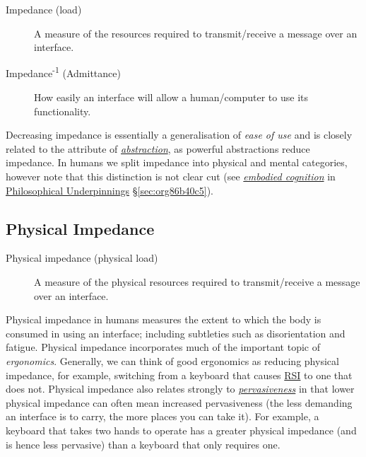 \documentclass[logo,bsc,singlespacing,parskip]{infthesis}
\begin{document}
\begin{mdframed}
\begin{description}
\item[{Impedance\label{impedance} (load)}] A measure of the resources required to transmit/receive a message over an interface.

\item[{Impedance\textsuperscript{-1} (Admittance)}] How easily an interface will allow a human/computer to use its functionality.
\end{description}
\end{mdframed}

Decreasing impedance is essentially a generalisation of \emph{ease of use} and is closely related to the attribute of \emph{\hyperref[abstraction]{abstraction}}, as powerful abstractions reduce impedance.
In humans we split impedance into physical and mental categories, however note that this distinction is not clear cut (see \emph{\hyperref[orgef09c3f]{embodied cognition}} in \hyperref[sec:org86b40c5]{Philosophical Underpinnings} \S \ref{sec:org86b40c5}).
\subsection{Physical Impedance}
\label{sec:org8699e79}
\medskip
\begin{mdframed}
\begin{description}
\item[{Physical impedance\label{physical impedance} (physical load)}] A measure of the physical resources required to transmit/receive a message over an interface.
\end{description}
\end{mdframed}

Physical impedance in humans measures the extent to which the body is consumed in using an interface; including subtleties such as disorientation and fatigue.
Physical impedance incorporates much of the important topic of \emph{ergonomics}.
Generally, we can think of good ergonomics as reducing physical impedance, for example, switching from a keyboard that causes \hyperref[org77f0234]{RSI} to one that does not.
Physical impedance also relates strongly to \emph{\hyperref[pervasiveness]{pervasiveness}} in that lower physical impedance can often mean increased pervasiveness (the less demanding an interface is to carry, the more places you can take it).
For example, a keyboard that takes two hands to operate has a greater physical impedance (and is hence less pervasive) than a keyboard that only requires one.
\end{document}
